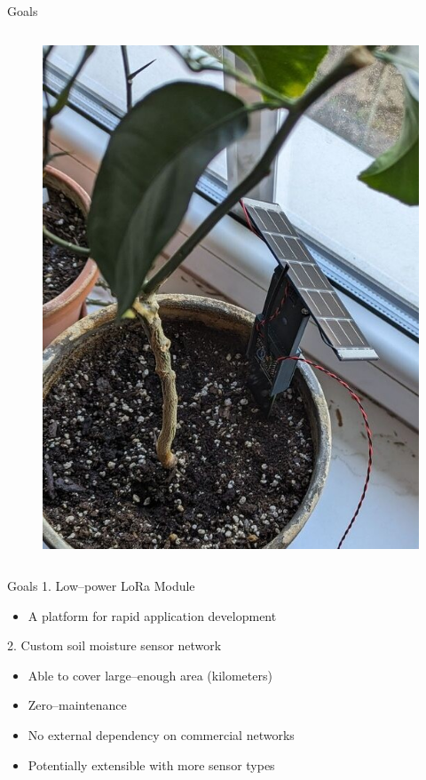 \documentclass[hyphens]{beamer}
\begin{document}
\begin{frame}{Goals}
\begin{columns}[T]
\begin{column}{.5\textwidth}
\begin{figure}
        \includegraphics[width=.9\linewidth]{img/sensor-deploy-up.jpg}
    \end{figure}
\end{column}
\end{columns}
\end{frame}


\begin{frame}{Goals}
1. Low--power LoRa Module
\begin{itemize}
    \item A platform for rapid application development
\end{itemize}
\vspace{1em}
2. Custom soil moisture sensor network
\begin{itemize}
    \item Able to cover large--enough area (kilometers)
    \item Zero--maintenance
    \item No external dependency on commercial networks
    \item Potentially extensible with more sensor types
\end{itemize}
\end{frame}
\end{document}
